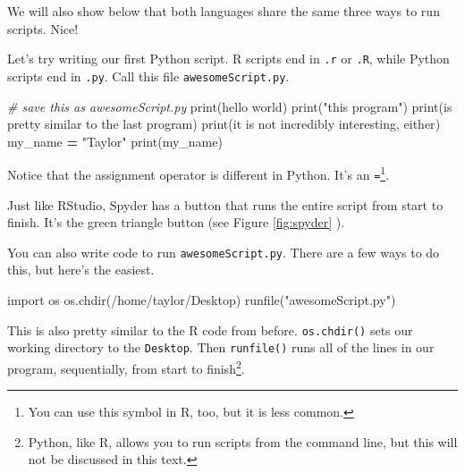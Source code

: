 \documentclass[
  12pt,
  krantz2]{krantz}
\makeatletter
\newenvironment{Shaded}{\begin{snugshade}}{\end{snugshade}}
\newcommand{\BuiltInTok}[1]{#1}
\newcommand{\CommentTok}[1]{\textcolor[rgb]{0.37,0.37,0.37}{\textit{#1}}}
\newcommand{\ImportTok}[1]{#1}
\newcommand{\NormalTok}[1]{#1}
\newcommand{\OperatorTok}[1]{\textcolor[rgb]{0.43,0.43,0.43}{\textbf{#1}}}
\newcommand{\StringTok}[1]{\textcolor[rgb]{0.5,0.5,0.5}{#1}}
\newenvironment{kframe}{%
\medskip{}
\setlength{\fboxsep}{.8em}
 \def\at@end@of@kframe{}%
 \ifinner\ifhmode%
  \def\at@end@of@kframe{\end{minipage}}%
  \begin{minipage}{\columnwidth}%
 \fi\fi%
 \def\FrameCommand##1{\hskip\@totalleftmargin \hskip-\fboxsep
 \colorbox{shadecolor}{##1}\hskip-\fboxsep
     \hskip-\linewidth \hskip-\@totalleftmargin \hskip\columnwidth}%
 \MakeFramed {\advance\hsize-\width
   \@totalleftmargin\z@ \linewidth\hsize
   \@setminipage}}%
 {\par\unskip\endMakeFramed%
 \at@end@of@kframe}
\renewenvironment{Shaded}{\begin{kframe}}{\end{kframe}}
\makeatother
\begin{document}
We will also show below that both languages share the same three ways to run scripts. Nice!

Let's try writing our first Python script. R scripts end in \texttt{.r} or \texttt{.R}, while Python scripts end in \texttt{.py}. Call this file \texttt{awesomeScript.py}.

\begin{Shaded}
\begin{Highlighting}[]
\CommentTok{\# save this as awesomeScript.py}
\BuiltInTok{print}\NormalTok{(}\StringTok{\textquotesingle{}hello world\textquotesingle{}}\NormalTok{)}
\BuiltInTok{print}\NormalTok{(}\StringTok{"this program"}\NormalTok{)}
\BuiltInTok{print}\NormalTok{(}\StringTok{\textquotesingle{}is pretty similar to the last program\textquotesingle{}}\NormalTok{)}
\BuiltInTok{print}\NormalTok{(}\StringTok{\textquotesingle{}it is not incredibly interesting, either\textquotesingle{}}\NormalTok{)}
\NormalTok{my\_name }\OperatorTok{=} \StringTok{"Taylor"}
\BuiltInTok{print}\NormalTok{(my\_name)}
\end{Highlighting}
\end{Shaded}

Notice that the assignment operator is different in Python. It's an \texttt{=}\footnote{You can use this symbol in R, too, but it is less common.}.

Just like RStudio, Spyder has a button that runs the entire script from start to finish. It's the green triangle button (see Figure \ref{fig:spyder} ).

You can also write code to run \texttt{awesomeScript.py}. There are a few ways to do this, but here's the easiest.

\begin{Shaded}
\begin{Highlighting}[]
\ImportTok{import}\NormalTok{ os}
\NormalTok{os.chdir(}\StringTok{\textquotesingle{}/home/taylor/Desktop\textquotesingle{}}\NormalTok{)}
\NormalTok{runfile(}\StringTok{"awesomeScript.py"}\NormalTok{)}
\end{Highlighting}
\end{Shaded}

This is also pretty similar to the R code from before. \texttt{os.chdir()} sets our working directory to the \texttt{Desktop}. Then \texttt{runfile()} runs all of the lines in our program, sequentially, from start to finish\footnote{Python, like R, allows you to run scripts from the command line, but this will not be discussed in this text.}.
\end{document}
